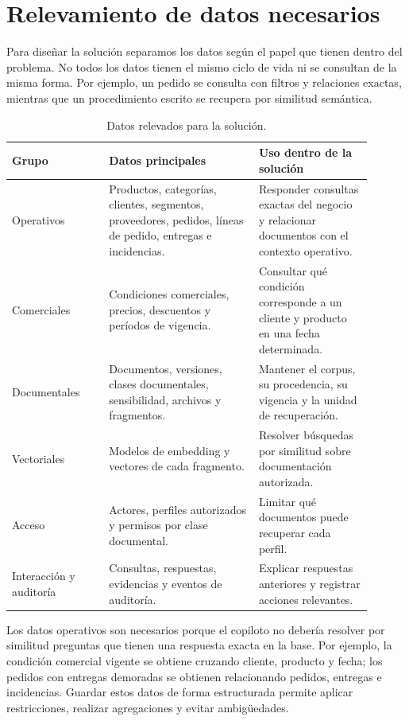 \section{Relevamiento de datos necesarios}

Para diseñar la solución separamos los datos según el papel que tienen dentro del problema. No todos los datos tienen el mismo ciclo de vida ni se consultan de la misma forma. Por ejemplo, un pedido se consulta con filtros y relaciones exactas, mientras que un procedimiento escrito se recupera por similitud semántica.

\begin{table}[ht]
\centering
\begin{tabular}{p{0.24\linewidth}p{0.37\linewidth}p{0.29\linewidth}}
\toprule
Grupo & Datos principales & Uso dentro de la solución \\
\midrule
Operativos & Productos, categorías, clientes, segmentos, proveedores, pedidos, líneas de pedido, entregas e incidencias. & Responder consultas exactas del negocio y relacionar documentos con el contexto operativo. \\
Comerciales & Condiciones comerciales, precios, descuentos y períodos de vigencia. & Consultar qué condición corresponde a un cliente y producto en una fecha determinada. \\
Documentales & Documentos, versiones, clases documentales, sensibilidad, archivos y fragmentos. & Mantener el corpus, su procedencia, su vigencia y la unidad de recuperación. \\
Vectoriales & Modelos de embedding y vectores de cada fragmento. & Resolver búsquedas por similitud sobre documentación autorizada. \\
Acceso & Actores, perfiles autorizados y permisos por clase documental. & Limitar qué documentos puede recuperar cada perfil. \\
Interacción y auditoría & Consultas, respuestas, evidencias y eventos de auditoría. & Explicar respuestas anteriores y registrar acciones relevantes. \\
\bottomrule
\end{tabular}
\caption{Datos relevados para la solución.}
\label{tab:relevamiento}
\end{table}

Los datos operativos son necesarios porque el copiloto no debería resolver por similitud preguntas que tienen una respuesta exacta en la base. Por ejemplo, la condición comercial vigente se obtiene cruzando cliente, producto y fecha; los pedidos con entregas demoradas se obtienen relacionando pedidos, entregas e incidencias. Guardar estos datos de forma estructurada permite aplicar restricciones, realizar agregaciones y evitar ambigüedades.

